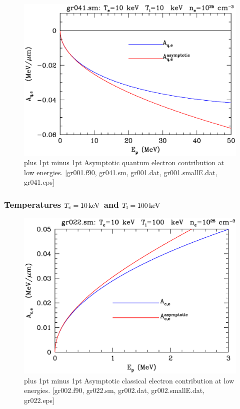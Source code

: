 \documentclass[preprint,12pt,eqsecnum,nofootinbib,amsmath,amssymb]{revtex4}
\newcommand{\smI}{{\rm\scriptscriptstyle I}}
\newcommand{\footnoteskip}{\baselineskip 12pt plus 1pt minus 1pt}
\begin{document}
\vskip-2cm 
\begin{figure}[h!]
\includegraphics[scale=0.45]{gr041.eps} 
\vskip-0.8cm 
\caption{\footnoteskip  
  Asymptotic quantum electron contribution at low
  energies. [gr001.f90, gr041.sm, gr001.dat, gr001.smallE.dat,
  gr041.eps] 
}
\label{fig:gr041}
\end{figure}


\pagebreak
\subsubsection{Temperatures $T_e=10\,{\rm keV}$ and $T_\smI=100\,{\rm keV}$}

\vskip-2cm 
\begin{figure}[h!]
\includegraphics[scale=0.45]{gr022.eps} 
\vskip-0.5cm 
\caption{\footnoteskip  
  Asymptotic classical electron contribution at low
  energies. [gr002.f90, gr022.sm, gr002.dat, gr002.smallE.dat,
  gr022.eps] 
}
\label{fig:gr022}
\end{figure}
\end{document}
